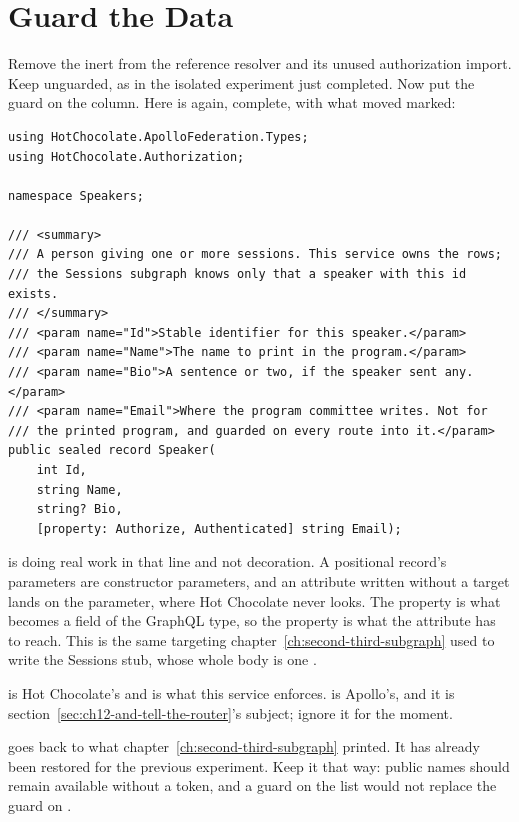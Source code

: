 \section{Guard the Data}
\label{sec:ch12-guard-the-data}

%
Remove the inert \code{[Authorize]} from the reference resolver and its
unused authorization import. Keep  unguarded, as in the isolated
experiment just completed. Now put the guard on the column. Here is
 again, complete, with what moved marked:

\begin{verbatim}
using HotChocolate.ApolloFederation.Types;
using HotChocolate.Authorization;

namespace Speakers;

/// <summary>
/// A person giving one or more sessions. This service owns the rows;
/// the Sessions subgraph knows only that a speaker with this id exists.
/// </summary>
/// <param name="Id">Stable identifier for this speaker.</param>
/// <param name="Name">The name to print in the program.</param>
/// <param name="Bio">A sentence or two, if the speaker sent any.</param>
/// <param name="Email">Where the program committee writes. Not for
/// the printed program, and guarded on every route into it.</param>
public sealed record Speaker(
    int Id,
    string Name,
    string? Bio,
    [property: Authorize, Authenticated] string Email);
\end{verbatim}

%
\code{[property:]} is doing real work in that line and not decoration. A
positional record's parameters are constructor parameters, and an attribute
written without a target lands on the parameter, where Hot Chocolate never
looks. The property is what becomes a field of the GraphQL type, so the
property is what the attribute has to reach. This is the same targeting
chapter~\ref{ch:second-third-subgraph} used to write the Sessions stub, whose
whole body is one .

\code{[Authorize]} is Hot Chocolate's and is what this service enforces.
\code{[Authenticated]} is Apollo's, and it is
section~\ref{sec:ch12-and-tell-the-router}'s subject; ignore it for the
moment.

%
 goes back to what chapter~\ref{ch:second-third-subgraph}
printed. It has already been restored for the previous experiment. Keep it
that way: public names should remain available without a token, and a guard
on the list would not replace the guard on .

